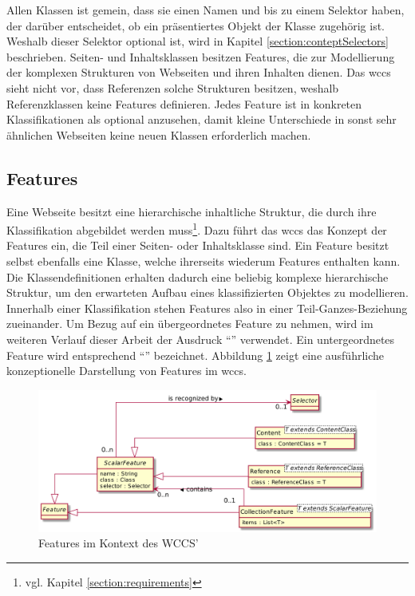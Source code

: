        Allen Klassen ist gemein, dass sie einen Namen und bis zu einem Selektor haben,
        der darüber entscheidet, ob ein präsentiertes Objekt der Klasse zugehörig ist.
        Weshalb dieser Selektor optional ist, wird in Kapitel \ref{section:conteptSelectors} beschrieben.
        Seiten- und Inhaltsklassen besitzen Features,
        die zur Modellierung der komplexen Strukturen von Webseiten und ihren Inhalten dienen.
        Das \gls{wccs} sieht nicht vor, dass Referenzen solche Strukturen besitzen,
        weshalb Referenzklassen keine Features definieren.
        Jedes Feature ist in konkreten Klassifikationen als optional anzusehen,
        damit kleine Unterschiede in sonst sehr ähnlichen Webseiten keine neuen Klassen erforderlich machen.

    \subsection{Features}
        \label{section:conceptFeatures}
        Eine Webseite besitzt eine hierarchische inhaltliche Struktur,
        die durch ihre Klassifikation abgebildet werden muss\footnote{vgl. Kapitel \ref{section:requirements}}.      
        Dazu führt das \gls{wccs} das Konzept der Features ein,
        die Teil einer Seiten- oder Inhaltsklasse sind.
        Ein Feature besitzt selbst ebenfalls eine Klasse,
        welche ihrerseits wiederum Features enthalten kann.
        Die Klassendefinitionen erhalten dadurch eine beliebig komplexe hierarchische Struktur,
        um den erwarteten Aufbau eines klassifizierten Objektes zu modellieren.
        Innerhalb einer Klassifikation stehen Features also in einer Teil-Ganzes-Beziehung zueinander.
        Um Bezug auf ein übergeordnetes Feature zu nehmen,
        wird im weiteren Verlauf dieser Arbeit der Ausdruck "`\parentFeature"' verwendet.
        Ein untergeordnetes Feature wird entsprechend "`\childFeature"' bezeichnet.
        Abbildung \ref{image:conceptFeatures} zeigt eine ausführliche
        konzeptionelle Darstellung von Features im \gls{wccs}.

        \begin{figure}[htb]
            \centering
            \includegraphics[scale=\imageScalingFactor]{../resources/concept/features.png}
            \caption{Features im Kontext des WCCS'}
            \label{image:conceptFeatures}
        \end{figure}

